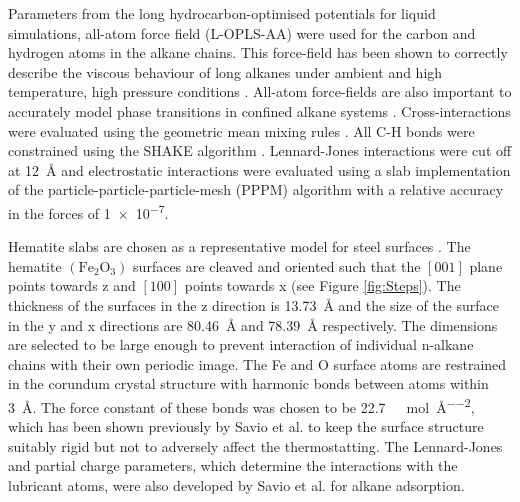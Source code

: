 \documentclass[aps,prb,reprint,superscriptaddress, a4paper]{revtex4-1}
\begin{document}
Parameters from the long hydrocarbon-optimised potentials for liquid simulations, all-atom force field (L-OPLS-AA)\cite{Jorgensen1996,Siu2012} were used for the carbon and hydrogen atoms in the alkane chains. This force-field has been shown to correctly describe the viscous behaviour of long alkanes under ambient and high temperature, high pressure conditions \cite{Ewen2016a}. All-atom force-fields are also important to accurately model phase transitions in confined alkane systems \cite{Docherty2010}. Cross-interactions were evaluated using the geometric mean mixing rules \cite{Jorgensen1996}. All C-H bonds were constrained using the SHAKE algorithm \cite{Ryckaert1977}. Lennard-Jones interactions were cut off at \SI{12}{\angstrom} and electrostatic interactions were evaluated using a slab implementation of the particle-particle-particle-mesh (PPPM) algorithm \cite{Yeh1999} with a relative accuracy in the forces of \SI{1e-7}{}.

Hematite slabs are chosen as a representative model for steel surfaces \cite{Oh1998}. The hematite $\left(\text{Fe}_2\text{O}_3\right)$ surfaces \cite{Maslen1994} are cleaved and oriented such that the $\left[001\right]$ plane points towards z and $\left[100\right]$ points towards x (see Figure \ref{fig:Steps}). The thickness of the surfaces in the z direction is \SI{13.73}{\angstrom} and the size of the surface in the y and x directions are \SI{80.46}{\angstrom} and \SI{78.39}{\angstrom} respectively. The dimensions are selected to be large enough to prevent interaction of individual n-alkane chains with their own periodic image. The Fe and O surface atoms are restrained in the corundum crystal structure with harmonic bonds between atoms within \SI{3}{\angstrom}. The force constant of these bonds was chosen to be \SI{22.7}{\kilo\calorie\per\mol\per\angstrom\squared}, which has been shown previously by Savio et al.\cite{Savio2012} to keep the surface structure suitably rigid but not to adversely affect the thermostatting\cite{Savio2012}. The Lennard-Jones and partial charge parameters, which determine the interactions with the lubricant atoms, were also developed by Savio et al. for alkane adsorption\cite{Savio2012}.
\end{document}
